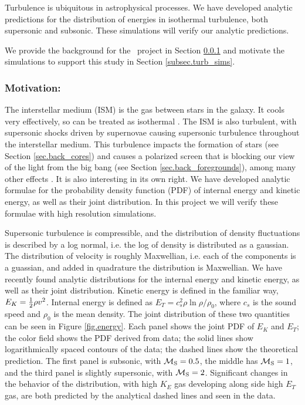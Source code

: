 Turbulence is ubiquitous in astrophysical processes.  We have developed analytic
predictions for the distribution of energies in isothermal turbulence, both
supersonic and subsonic. These simulations will verify our analytic predictions.

We provide the background for the \nameTurbulence\ project in Section
\ref{subsec.turb_motivate}
and motivate the simulations to support this study in Section
\ref{subsec.turb_sims}.


\subsubsection{Motivation: \nameTurbulence}
\label{subsec.turb_motivate}

The interstellar medium (ISM) is the gas between stars in the galaxy.  It cools
very effectively, so can be treated as isothermal .  The ISM is also turbulent, with supersonic shocks driven by supernovae
causing supersonic turbulence throughout the interstellar medium.  This
turbulence impacts the formation of stars (see Section \ref{sec.back_cores}) and
causes a polarized screen that is blocking our view of the light from the big bang (see
Section \ref{sec.back_foregrounds}), among many other effects
\citep{Elmegreen04}. It is also interesting in its own right.  We have developed
analytic formulae for the probability density function (PDF) of internal energy
and kinetic energy, as well as their joint distribution.  In this project we
will verify these formulae with high resolution simulations.

Supersonic turbulence is compressible, and the distribution of density
fluctuations is described by a log normal, i.e. the log of density is
distributed as a gaussian.  The distribution of velocity is roughly Maxwellian,
i.e. each of the components is a guassian, and added in quadrature the
distribution is Maxwellian.  
We have recently found analytic distributions for the internal energy and
kinetic energy, as well as their joint
distribution.   Kinetic energy is defined in the familiar way, $E_K=\frac{1}{2} \rho
v^2$.  Internal energy is defined as $E_T= c_s^2 \rho \ln \rho/\rho_0$, where
$c_s$ is the sound speed and $\rho_0$ is the mean density.  The joint
distribution of these two quantities can be seen in Figure \ref{fig.energy}.
Each panel shows the joint PDF of $E_K$ and $E_T$;  the color field shows the
PDF derived from data; the solid lines show logarithmically spaced contours of
the data; the dashed lines show the theoretical prediction.  The first panel is
subsonic, with $\mathcal{M_{\rm{S}}}=0.5$, the middle has $\mathcal{M_{\rm{S}}}=1$, and the third panel is
slightly supersonic, with $\mathcal{M_{\rm{S}}}=2$.  Significant changes in the behavior of the
distribution, with high $K_E$ gas developing along side high $E_T$ gas, are both
predicted by the analytical dashed lines and seen in the data.

